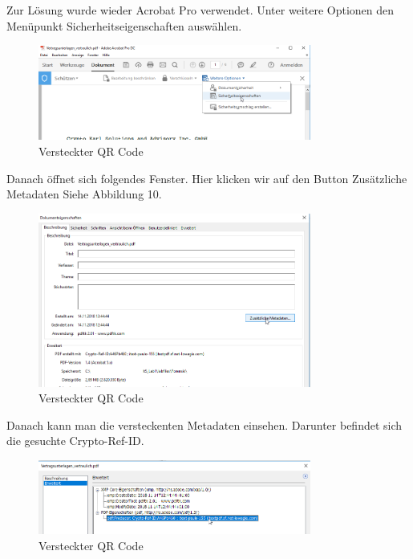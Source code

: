 \documentclass[12pt,a4paper,titlepage,oneside]{scrartcl}
\begin{document}
Zur Lösung wurde wieder Acrobat Pro verwendet.
Unter weitere Optionen den Menüpunkt Sicherheitseigenschaften auswählen.

\begin{figure}[h!]
  \centering
    \includegraphics[width=0.8\textwidth]{./imgs/Forensik/refid1.png}
  \caption{Versteckter QR Code}
  \label{fig:allvoipcalls}
\end{figure}


Danach öffnet sich folgendes Fenster.
Hier klicken wir auf den Button Zusätzliche Metadaten 
Siehe Abbildung 10.
\begin{figure}[h!]
  \centering
    \includegraphics[width=0.8\textwidth]{./imgs/Forensik/refid2.png}
  \caption{Versteckter QR Code}
  \label{fig:allvoipcalls}
\end{figure}

Danach kann man die versteckenten Metadaten einsehen.
 Darunter befindet sich die gesuchte Crypto-Ref-ID.

\begin{figure}[h!]
  \centering
    \includegraphics[width=0.8\textwidth]{./imgs/Forensik/refid3.png}
  \caption{Versteckter QR Code}
  \label{fig:allvoipcalls}
\end{figure}
\end{document}
